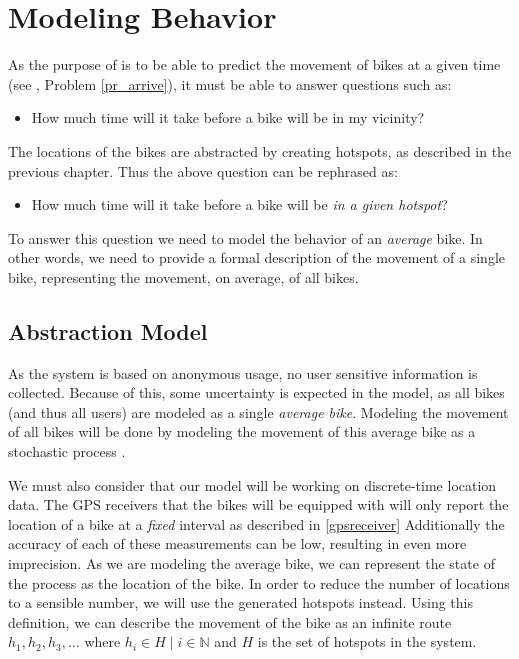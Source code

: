 \section{Modeling Behavior}\label{modelbehavior}
As the purpose of \projectname{} is to be able to predict the movement of bikes at a given time (see , Problem \ref{pr_arrive}), it must be able to answer questions such as: 

\begin{itemize}
\item How much time will it take before a bike will be in my vicinity?
\end{itemize}

The locations of the bikes are abstracted by creating hotspots, as described in the previous chapter.
Thus the above question can be rephrased as: 

\begin{itemize}
\item How much time will it take before a bike will be \emph{in a given hotspot}?
\end{itemize}

To answer this question we need to model the behavior of an \emph{average} bike.
In other words, we need to provide a formal description of the movement of a single bike, representing the movement, on average, of all bikes.

\subsection{Abstraction Model}
As the system is based on anonymous usage, no user sensitive information is collected.
Because of this, some uncertainty is expected in the model, as all bikes (and thus all users) are modeled as a single \textit{average bike}.
Modeling the movement of all bikes will be done by modeling the movement of this average bike as a stochastic process \cite{stochastic}.

We must also consider that our model will be working on discrete-time location data.
The GPS receivers that the bikes will be equipped with will only report the location of a bike at a \textit{fixed} interval as described in \ref{gpsreceiver}
Additionally the accuracy of each of these measurements can be low, resulting in even more imprecision.
As we are modeling the average bike, we can represent the state of the process as the location of the bike.
In order to reduce the number of locations to a sensible number, we will use the generated hotspots instead.
Using this definition, we can describe the movement of the bike as an infinite route $h_1, h_2, h_3, \dots$ where $h_i \in H \mid i \in \mathbb{N}$ and $H$ is the set of hotspots in the system.


